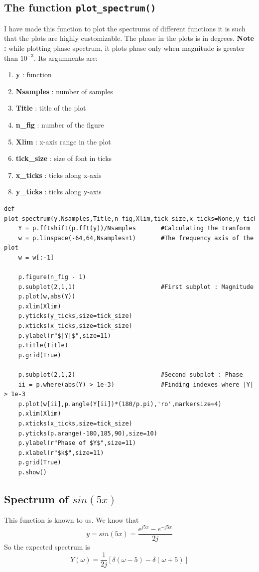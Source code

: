 \documentclass[11pt, a4paper]{article}
\begin{document}
    \subsection{The function \texttt{plot\_spectrum()}}
    I have made this function to plot the spectrums of different functions it is  such that the plots are highly customizable. The phase in the plots is in degrees. \textbf{Note :} while plotting phase spectrum, it plots phase only when magnitude is greater than $10^{-3}$. Its argumnents are:
    \begin{enumerate}
        \item \textbf{y} : function
        \item \textbf{Nsamples} : number of samples
        \item \textbf{Title} : title of the plot
        \item \textbf{n\_fig} : number of the figure
        \item \textbf{Xlim} : x-axis range in the plot
        \item \textbf{tick\_size} : size of font in ticks
        \item \textbf{x\_ticks} : ticks along x-axis
        \item \textbf{y\_ticks} : ticks along y-axis
    \end{enumerate}
    \begin{verbatim}
def plot_spectrum(y,Nsamples,Title,n_fig,Xlim,tick_size,x_ticks=None,y_ticks=None):
    Y = p.fftshift(p.fft(y))/Nsamples       #Calculating the tranform
    w = p.linspace(-64,64,Nsamples+1)       #The frequency axis of the plot
    w = w[:-1]

    p.figure(n_fig - 1)
    p.subplot(2,1,1)                        #First subplot : Magnitude
    p.plot(w,abs(Y))
    p.xlim(Xlim)
    p.yticks(y_ticks,size=tick_size)
    p.xticks(x_ticks,size=tick_size)
    p.ylabel(r"$|Y|$",size=11)
    p.title(Title)
    p.grid(True)

    p.subplot(2,1,2)                        #Second subplot : Phase
    ii = p.where(abs(Y) > 1e-3)             #Finding indexes where |Y| > 1e-3
    p.plot(w[ii],p.angle(Y[ii])*(180/p.pi),'ro',markersize=4)
    p.xlim(Xlim)
    p.xticks(x_ticks,size=tick_size)
    p.yticks(p.arange(-180,185,90),size=10)
    p.ylabel(r"Phase of $Y$",size=11)
    p.xlabel(r"$k$",size=11)
    p.grid(True)
    p.show()
    \end{verbatim}
    \subsection{Spectrum of $sin(5x)$}
    This function is known to us. We know that
    \begin{equation*}
        y = sin(5x) = \frac{e^{j5x} - e^{-j5x}}{2j}
    \end{equation*}
    So the expected spectrum is
    \begin{equation*}
        Y(\omega) = \frac{1}{2j} [\delta(\omega - 5) - \delta(\omega + 5)]
    \end{equation*}
\end{document}
